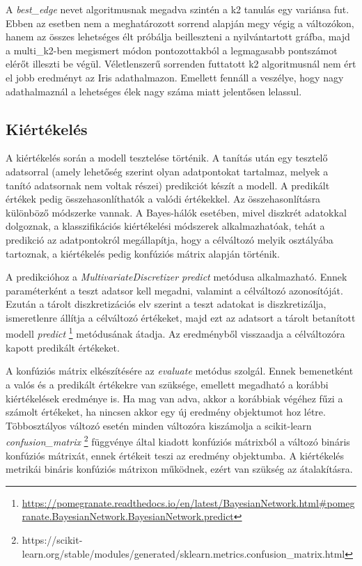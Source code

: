 A \emph{best\_edge} nevet algoritmusnak megadva szintén a k2 tanulás egy variánsa fut. Ebben az esetben nem a meghatározott sorrend alapján megy végig a változókon, hanem az összes lehetséges élt próbálja beilleszteni a nyilvántartott gráfba, majd a multi\_k2-ben megismert módon pontozottakból a legmagasabb pontszámot elérőt illeszti be végül. Véletlenszerű sorrenden futtatott k2 algoritmusnál nem ért el jobb eredményt az Iris adathalmazon. Emellett fennáll a veszélye, hogy nagy adathalmaznál a lehetséges élek nagy száma miatt jelentősen lelassul.

\subsection{Kiértékelés}
A kiértékelés során a modell tesztelése történik. A tanítás után egy tesztelő adatsorral (amely lehetőség szerint olyan adatpontokat tartalmaz, melyek a tanító adatsornak nem voltak részei) predikciót készít a modell. A predikált értékek pedig összehasonlíthatók a valódi értékekkel. Az összehasonlításra különböző módszerke vannak. A Bayes-hálók esetében, mivel diszkrét adatokkal dolgoznak, a klasszifikációs kiértékelési módszerek alkalmazhatóak, tehát a predikció az adatpontokról megállapítja, hogy a célváltozó melyik osztályába tartoznak, a kiértékelés pedig konfúziós mátrix alapján történik.

A predikcióhoz a \emph{MultivariateDiscretizer predict} metódusa alkalmazható. Ennek paraméterként a teszt adatsor kell megadni, valamint a célváltozó azonosítóját. Ezután a tárolt diszkretizációs elv szerint a teszt adatokat is diszkretizálja, ismeretlenre állítja a célváltozó értékeket, majd ezt az adatsort a tárolt betanított modell \emph{predict} \footnote{\url{https://pomegranate.readthedocs.io/en/latest/BayesianNetwork.html\#pomegranate.BayesianNetwork.BayesianNetwork.predict}} metódusának átadja. Az eredményből visszaadja a célváltozóra kapott predikált értékeket.

A konfúziós mátrix elkészítésére az \emph{evaluate} metódus szolgál. Ennek bemenetként a valós és a predikált értékekre van szüksége, emellett megadható a korábbi kiértékelések eredménye is. Ha mag van adva, akkor a korábbiak végéhez fűzi a számolt értékeket, ha nincsen akkor egy új eredmény objektumot hoz létre. Többosztályos változó esetén minden változóra kiszámolja a scikit-learn \emph{confusion\_matrix} \footnote{https://scikit-learn.org/stable/modules/generated/sklearn.metrics.confusion\_matrix.html} függvénye által kiadott konfúziós mátrixból a változó bináris konfúziós mátrixát, ennek értékeit teszi az eredmény objektumba. A kiértékelés metrikái bináris konfúziós mátrixon működnek, ezért van szükség az átalakításra.

